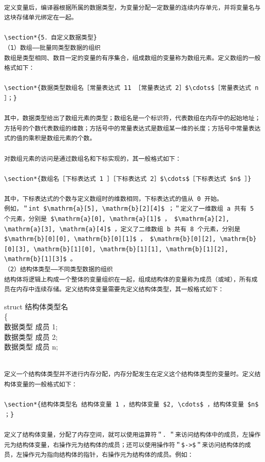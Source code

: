 \documentclass[10pt]{article}
\begin{document}
\begin{verbatim}

定义变量后，编译器根据所属的数据类型，为变量分配一定数量的连续内存单元，并将变量名与这块存储单元绑定在一起。

\section*{5．自定义数据类型}
（1）数组——批量同类型数据的组织
数组是类型相同、数目一定的变量的有序集合，组成数组的变量称为数组元素。定义数组的一般格式如下：

\section*{数据类型数组名［常量表达式 11 ［常量表达式 2］$\cdots$［常量表达式 n ］；}

其中，数据类型给出了数组元素的类型；数组名是一个标识符，代表数组在内存中的起始地址；方括号的个数代表数组的维数；方括号中的常量表达式是数组某一维的长度；方括号中常量表达式的值的乘积是数组元素的个数。

对数组元素的访问是通过数组名和下标实现的，其一般格式如下：

\section*{数组名［下标表达式 1 ］［下标表达式 2］$\cdots$［下标表达式 $n$ ］}

其中，下标表达式的个数与定义数组时的维数相同，下标表达式的值从 0 开始。
例如，＂int $\mathrm{a}[5], \mathrm{b}[2][4]$ ；＂定义了一维数组 a 共有 5 个元素，分别是 $\mathrm{a}[0], \mathrm{a}[1]$ ， $\mathrm{a}[2], \mathrm{a}[3], \mathrm{a}[4]$ ，定义了二维数组 b 共有 8 个元素，分别是 $\mathrm{b}[0][0], \mathrm{b}[0][1]$ ， $\mathrm{b}[0][2], \mathrm{b}[0][3], \mathrm{b}[1][0], \mathrm{b}[1][1], \mathrm{b}[1][2], \mathrm{b}[1][3]$ 。
（2）结构体类型——不同类型数据的组织
结构体将逻辑上构成一个整体的变量组织在一起，组成结构体的变量称为成员（或域），所有成员在内存中连续存储。定义结构体变量需要先定义结构体类型，其一般格式如下：
\end{verbatim}

struct 结构体类型名\\
\{\\
数据类型 成员 1;\\
数据类型 成员 2;\\
数据类型 成员 n;

\begin{verbatim}

定义一个结构体类型并不进行内存分配，内存分配发生在定义这个结构体类型的变量时。定义结构体变量的一般格式如下：

\section*{结构体类型名 结构体变量 1 ，结构体变量 $2, \cdots$ ，结构体变量 $n$ ；}

定义了结构体变量，分配了内存空间，就可以使用运算符＂．＂来访问结构体中的成员，左操作元为结构体变量，右操作元为结构体的成员；还可以使用操作符＂$->$＂来访问结构体的成员，左操作元为指向结构体的指针，右操作元为结构体的成员。例如：
\end{verbatim}
\end{document}
